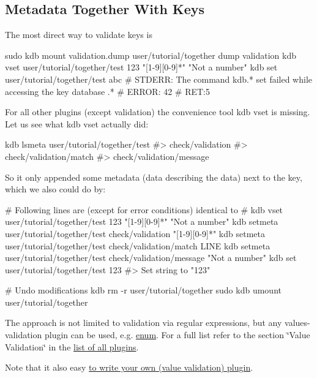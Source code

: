 \subsection*{Metadata Together With Keys}

The most direct way to validate keys is


\begin{DoxyCode}
sudo kdb mount validation.dump user/tutorial/together dump validation
kdb vset user/tutorial/together/test 123 "[1-9][0-9]*" "Not a number"
kdb set user/tutorial/together/test abc
# STDERR: The command kdb.* set failed while accessing the key database .*
# ERROR:  42
# RET:5
\end{DoxyCode}


For all other plugins (except {\ttfamily validation}) the convenience tool {\ttfamily kdb vset} is missing. Let us see what {\ttfamily kdb vset} actually did\+:


\begin{DoxyCode}
kdb lsmeta user/tutorial/together/test
#> check/validation
#> check/validation/match
#> check/validation/message
\end{DoxyCode}


So it only appended some metadata (data describing the data) next to the key, which we also could do by\+:


\begin{DoxyCode}
# Following lines are (except for error conditions) identical to
# kdb vset user/tutorial/together/test 123 "[1-9][0-9]*" "Not a number"
kdb setmeta user/tutorial/together/test check/validation "[1-9][0-9]*"
kdb setmeta user/tutorial/together/test check/validation/match LINE
kdb setmeta user/tutorial/together/test check/validation/message "Not a number"
kdb set user/tutorial/together/test 123
#> Set string to "123"

# Undo modifications
kdb rm -r user/tutorial/together
sudo kdb umount user/tutorial/together
\end{DoxyCode}


The approach is not limited to validation via regular expressions, but any values-\/validation plugin can be used, e.\+g. \hyperlink{md_src_plugins_enum_README_src_plugins_enum_README_md}{enum}. For a full list refer to the section \char`\"{}\+Value Validation\char`\"{} in the \hyperlink{md_src_plugins_README_src_plugins_README_md}{list of all plugins}.

Note that it also easy \hyperlink{doc_tutorials_plugins_md}{to write your own (value validation) plugin}.

